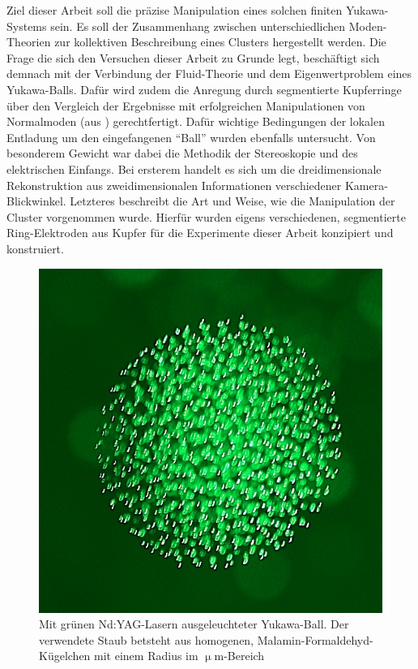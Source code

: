 \documentclass[numbers=noenddot,a4paper,notitlepage,twoside,BCOR15mm]{scrbook}
\begin{document}
		Ziel dieser Arbeit soll die präzise Manipulation eines solchen finiten Yukawa-Systems sein. Es soll der Zusammenhang zwischen unterschiedlichen Moden-Theorien zur kollektiven Beschreibung eines Clusters hergestellt werden. Die Frage die sich den Versuchen dieser Arbeit zu Grunde legt, beschäftigt sich demnach mit der Verbindung der Fluid-Theorie und dem Eigenwertproblem eines Yukawa-Balls. Dafür wird zudem die Anregung durch segmentierte Kupferringe über den Vergleich der Ergebnisse mit erfolgreichen Manipulationen von Normalmoden (aus \cite{Mulsow13}) gerechtfertigt. Dafür wichtige Bedingungen der lokalen Entladung um den eingefangenen "`Ball"' wurden ebenfalls untersucht. Von besonderem Gewicht war dabei die Methodik der Stereoskopie und des elektrischen Einfangs. Bei ersterem handelt es sich um die dreidimensionale Rekonstruktion aus zweidimensionalen Informationen verschiedener Kamera-Blickwinkel. Letzteres beschreibt die Art und Weise, wie die Manipulation der Cluster vorgenommen wurde. Hierfür wurden eigens verschiedenen, segmentierte Ring-Elektroden aus Kupfer für die Experimente dieser Arbeit konzipiert und konstruiert.\newline

		\begin{figure}[!h]
		\centering
			\begin{minipage}{0.49\textwidth}
				\centering
				\includegraphics[scale=1.]{figs/cluster.png}
			\end{minipage}
			\begin{minipage}{0.48\textwidth}
				\caption{Mit grünen Nd:YAG-Lasern ausgeleuchteter Yukawa-Ball. Der verwendete Staub  betsteht aus homogenen, Malamin-Formaldehyd-Kügelchen mit einem Radius im $\upmu$m-Bereich}
			\end{minipage}
		\end{figure}
\end{document}
